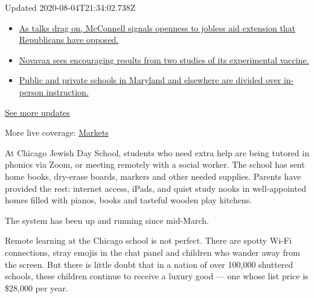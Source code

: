 Updated 2020-08-04T21:34:02.738Z

\begin{itemize}
\tightlist
\item
  \href{https://www.nytimes3xbfgragh.onion/2020/08/04/world/coronavirus-cases.html?action=click\&pgtype=Article\&state=default\&region=MAIN_CONTENT_1\&context=storylines_live_updates\#link-2daa96b5}{As
  talks drag on, McConnell signals openness to jobless aid extension
  that Republicans have opposed.}
\item
  \href{https://www.nytimes3xbfgragh.onion/2020/08/04/world/coronavirus-cases.html?action=click\&pgtype=Article\&state=default\&region=MAIN_CONTENT_1\&context=storylines_live_updates\#link-1228a480}{Novavax
  sees encouraging results from two studies of its experimental
  vaccine.}
\item
  \href{https://www.nytimes3xbfgragh.onion/2020/08/04/world/coronavirus-cases.html?action=click\&pgtype=Article\&state=default\&region=MAIN_CONTENT_1\&context=storylines_live_updates\#link-4825b93}{Public
  and private schools in Maryland and elsewhere are divided over
  in-person instruction.}
\end{itemize}

\href{https://www.nytimes3xbfgragh.onion/2020/08/04/world/coronavirus-cases.html?action=click\&pgtype=Article\&state=default\&region=MAIN_CONTENT_1\&context=storylines_live_updates}{See
more updates}

More live coverage:
\href{https://www.nytimes3xbfgragh.onion/live/2020/08/04/business/stock-market-today-coronavirus?action=click\&pgtype=Article\&state=default\&region=MAIN_CONTENT_1\&context=storylines_live_updates}{Markets}

At Chicago Jewish Day School, students who need extra help are being
tutored in phonics via Zoom, or meeting remotely with a social worker.
The school has sent home books, dry-erase boards, markers and other
needed supplies. Parents have provided the rest: internet access, iPads,
and quiet study nooks in well-appointed homes filled with pianos, books
and tasteful wooden play kitchens.

The system has been up and running since mid-March.

Remote learning at the Chicago school is not perfect. There are spotty
Wi-Fi connections, stray emojis in the chat panel and children who
wander away from the screen. But there is little doubt that in a nation
of over 100,000 shuttered schools, these children continue to receive a
luxury good --- one whose list price is \$28,000 per year.

